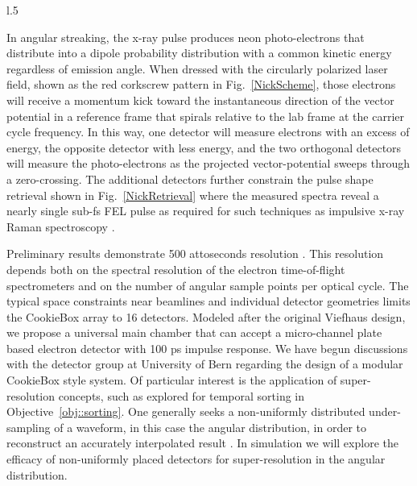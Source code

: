 \begin{wrapfigure}[20]{l}{.5\linewidth}
\vspace{-\baselineskip}
\vspace{-1\baselineskip}
\caption{\label{NickRetrieval}X-ray pulse shape retrieval from our recent angular streaking measurement at LCLS \cite{Nick2016}.}
\end{wrapfigure}

In angular streaking, the x-ray pulse produces neon photo-electrons that distribute into a dipole probability distribution with a common kinetic energy regardless of emission angle.
When dressed with the circularly polarized laser field, shown as the red corkscrew pattern in Fig.~\ref{NickScheme}, those electrons will receive a momentum kick toward the instantaneous direction of the vector potential in a reference frame that spirals relative to the lab frame at the carrier cycle frequency.
In this way, one detector will measure electrons with an excess of energy, the opposite detector with less energy, and the two orthogonal detectors will measure the photo-electrons as the projected vector-potential sweeps through a zero-crossing.
The additional detectors further constrain the pulse shape retrieval shown in Fig.~\ref{NickRetrieval} where the measured spectra reveal a nearly single sub-fs FEL pulse as required for such techniques as impulsive x-ray Raman spectroscopy \cite{TIGER2015}.

Preliminary results demonstrate 500 attoseconds resolution \cite{Nick2016}.
This resolution depends both on the spectral resolution of the electron time-of-flight spectrometers and on the number of angular sample points per optical cycle.
The typical space constraints near beamlines and individual detector geometries limits the CookieBox array to 16 detectors. %
Modeled after the original Viefhaus design, we propose a universal main chamber that can accept a micro-channel plate based electron detector with 100 ps impulse response.
We have begun discussions with the detector group at University of Bern regarding the design of a modular CookieBox style system.
Of particular interest is the application of super-resolution concepts, such as explored for temporal sorting in Objective~\ref{obj::sorting}.
One generally seeks a non-uniformly distributed under-sampling of a waveform, in this case the angular distribution, in order to reconstruct an accurately interpolated result \cite{Candes2004a,Candes2004b,Candes2005,Elad2006}. 
In simulation we will explore the efficacy of non-uniformly placed detectors for super-resolution in the angular distribution.

